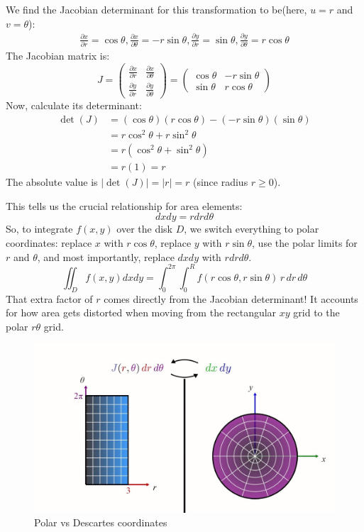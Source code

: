 \documentclass[11pt]{article}
\begin{document}
We find the Jacobian determinant for this transformation to be(here, $u=r$ and $v=\theta$):
\begin{align*}
    \frac{\partial x}{\partial r} = \cos \theta,  \frac{\partial x}{\partial \theta} = -r \sin \theta, \frac{\partial y}{\partial r} = \sin \theta, \frac{\partial y}{\partial \theta} = r \cos \theta
\end{align*}
The Jacobian matrix is:
$$ J = \begin{pmatrix} \frac{\partial x}{\partial r} & \frac{\partial x}{\partial \theta} \\ \frac{\partial y}{\partial r} & \frac{\partial y}{\partial \theta} \end{pmatrix} = \begin{pmatrix} \cos \theta & -r \sin \theta \\ \sin \theta & r \cos \theta \end{pmatrix} $$
Now, calculate its determinant:
\begin{align*} \det(J) &= (\cos \theta)(r \cos \theta) - (-r \sin \theta)(\sin \theta) \\ &= r \cos^2 \theta + r \sin^2 \theta \\ &= r (\cos^2 \theta + \sin^2 \theta) \\ &= r(1) = r \end{align*}
The absolute value is $|\det(J)| = |r| = r$ (since radius $r \ge 0$).

This tells us the crucial relationship for area elements:
$$ dx dy = r dr d\theta $$
So, to integrate $f(x,y)$ over the disk $D$, we switch everything to polar coordinates: replace $x$ with $r\cos\theta$, replace $y$ with $r\sin\theta$, use the polar limits for $r$ and $\theta$, and most importantly, replace $dx dy$ with $r dr d\theta$.
$$ \iint_D f(x,y) dx dy = \int_{0}^{2\pi} \int_{0}^{R} f(r\cos\theta, r\sin\theta) \, r \, dr \, d\theta $$
That extra factor of $r$ comes directly from the Jacobian determinant! It accounts for how area gets distorted when moving from the rectangular $xy$ grid to the polar $r\theta$ grid. 

\begin{figure}[h]
    \centering
    \includegraphics[width=0.5\linewidth]{LA Lecture notes/figures/polar vs descartes.jpg}
    \caption{Polar vs Descartes coordinates}
    \label{fig:enter-label}
\end{figure}
\end{document}
